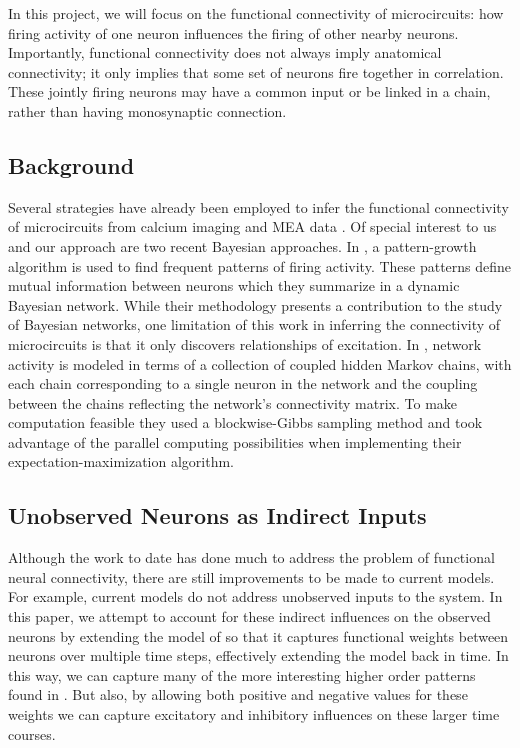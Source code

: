 \documentclass{article}
\begin{document}

In this project, we will focus on the functional connectivity of
microcircuits: how firing activity of one neuron influences the firing of other nearby neurons.
Importantly, functional connectivity does not always imply anatomical connectivity; it only implies that
some set of neurons fire together in correlation.  These jointly firing neurons may have a common input
or be linked in a chain, rather than having monosynaptic connection.

\subsection{Background}

Several strategies have already been employed to infer the functional
connectivity of microcircuits from calcium imaging and MEA data
\citep{Gerwinn2010, takahashi2007, aguiar2009}. Of special interest to us and our approach
are two recent Bayesian approaches. In \citep{patnaik2011}, 
a pattern-growth algorithm is used to find frequent patterns of firing 
activity. These patterns define mutual information between neurons
which they summarize in a dynamic Bayesian network. While their
methodology presents a contribution to the study of Bayesian networks,
one limitation of this work in inferring the connectivity of
microcircuits is that it only discovers relationships of excitation. In \citep{mishchencko2011}, network activity is modeled in terms of a collection of coupled hidden Markov chains, with each chain
corresponding to a single neuron in the network and the coupling
between the chains reflecting the network’s connectivity matrix.
To make computation feasible they used a blockwise-Gibbs sampling
method and took advantage of the parallel computing possibilities
when implementing their expectation-maximization algorithm. 

\subsection{Unobserved Neurons as Indirect Inputs}

Although the work to date has done much to address the problem of
functional neural connectivity, there are still improvements to be
made to current models. For example, current models do not address
unobserved inputs to the system. In this paper, we attempt to account for these indirect influences on the observed neurons by extending the model of \citep{mishchencko2011} so that it captures functional weights between neurons over multiple time steps, effectively extending the model back in time. In this way, we can capture many of the more interesting higher order patterns found in \citep{patnaik2011}.  But also, by allowing both positive and negative values for these weights we can capture excitatory and inhibitory influences on these larger time courses.
\end{document}
